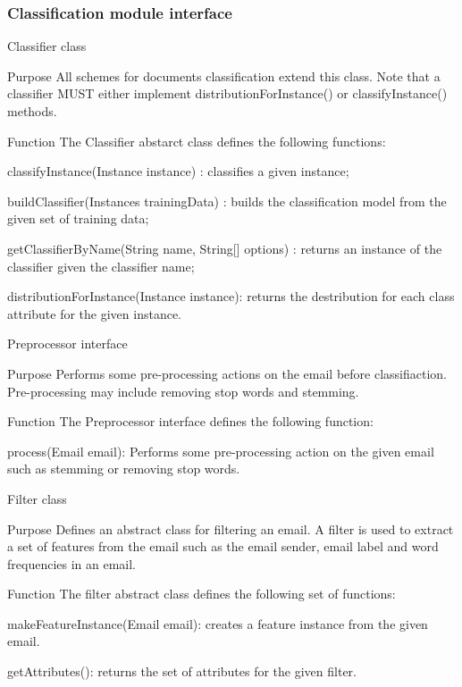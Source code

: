 \documentclass[12pt]{article}
\newenvironment{my_itemize}
{\begin{itemize}
  \setlength{\itemsep}{0cm}
  \setlength{\parskip}{0cm}}
{\end{itemize}}
\newenvironment{my_desc}
{\begin{description}
  \setlength{\itemsep}{0cm}
  \setlength{\parskip}{0cm}}
{\end{description}}
\begin{document}
\subsubsection{Classification module interface}
\begin{my_itemize}
  \item Classifier class
  \begin{my_desc}
   \item[Purpose] All schemes for documents classification extend this class. Note that a classifier MUST either implement distributionForInstance() or classifyInstance() methods.
   \item[Function] The Classifier abstarct class defines the following functions:
	\begin{my_itemize}
		\item classifyInstance(Instance instance) : classifies a given instance;
		\item buildClassifier(Instances trainingData) : builds the classification model from the given set of training data;
		\item getClassifierByName(String name, String[] options) : returns an instance of the classifier given the classifier name;
		\item distributionForInstance(Instance instance): returns the destribution for each class attribute for the given instance.
	\end{my_itemize}
  \end{my_desc}

  \item Preprocessor interface
  \begin{my_desc}
   \item[Purpose] Performs some pre-processing actions on the email before classifiaction. Pre-processing may include removing stop words and stemming. 
   \item[Function] The Preprocessor interface defines the following function:
	\begin{my_itemize}
	\item process(Email email): Performs some pre-processing action on the given email such as stemming or removing stop words.
	\end{my_itemize}
  \end{my_desc}

  \item Filter class
  \begin{my_desc}
   \item[Purpose] Defines an abstract class for filtering an email. A filter is used to extract a set of features from the email such as the email sender, email label and word frequencies in an email.
   \item[Function] The filter abstract class defines the following set of functions:
	\begin{my_itemize}
	\item makeFeatureInstance(Email email): creates a feature instance from the given email.
	\item getAttributes(): returns the set of attributes for the given filter.
	\end{my_itemize}
  \end{my_desc}


\end{my_itemize}
\end{document}
